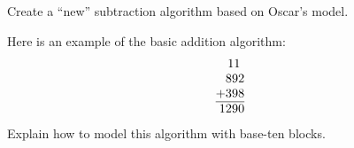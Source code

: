 \begin{prob} Create a ``new'' subtraction algorithm based on Oscar's model.
\end{prob}


\begin{prob}
Here is an example of the basic addition algorithm:
\[
\begin{tabular}{@{}r@{}}
11~~\\
892\\
+398\\ \hline
1290
\end{tabular}
\]
Explain how to model this algorithm with base-ten blocks.
\end{prob}




